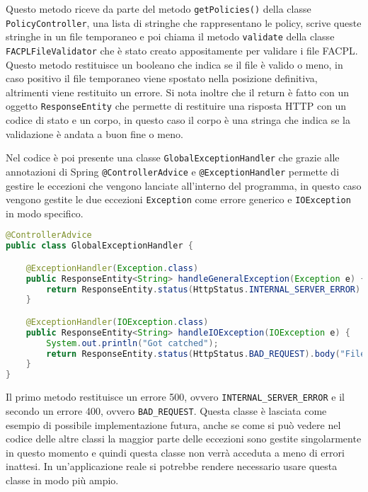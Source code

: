 Questo metodo riceve da parte del metodo \texttt{getPolicies()} della classe \texttt{PolicyController}, una lista di stringhe che rappresentano le policy, scrive queste stringhe in un file temporaneo e poi chiama il metodo \texttt{validate} della classe \texttt{FACPLFileValidator} che è stato creato appositamente per validare i file FACPL. Questo metodo restituisce un booleano che indica se il file è valido o meno, in caso positivo il file temporaneo viene spostato nella posizione definitiva, altrimenti viene restituito un errore. Si nota inoltre che il return è fatto con un oggetto \texttt{ResponseEntity} che permette di restituire una risposta HTTP con un codice di stato e un corpo, in questo caso il corpo è una stringa che indica se la validazione è andata a buon fine o meno.\par
Nel codice è poi presente una classe \texttt{GlobalExceptionHandler} che grazie alle annotazioni di Spring \texttt{@ControllerAdvice} e \texttt{@ExceptionHandler} permette di gestire le eccezioni che vengono lanciate all'interno del programma, in questo caso vengono gestite le due eccezioni \texttt{Exception} come errore generico e \texttt{IOException} in modo specifico.
\begin{lstlisting}[language=Java, caption=GlobalExceptionHandler, label=code:GlobalExceptionHandler, basicstyle=\fontsize{9.5}{11}\ttfamily]
@ControllerAdvice
public class GlobalExceptionHandler {

    @ExceptionHandler(Exception.class)
    public ResponseEntity<String> handleGeneralException(Exception e) {
        return ResponseEntity.status(HttpStatus.INTERNAL_SERVER_ERROR).body("An unexpected error occurred: " + e.getMessage());
    }

    @ExceptionHandler(IOException.class)
    public ResponseEntity<String> handleIOException(IOException e) {
    	System.out.println("Got catched");
        return ResponseEntity.status(HttpStatus.BAD_REQUEST).body("File processing error: " + e.getMessage());
    }
}
\end{lstlisting}
Il primo metodo restituisce un errore 500, ovvero \texttt{INTERNAL\_SERVER\_ERROR} e il secondo un errore 400, ovvero \texttt{BAD\_REQUEST}. Questa classe è lasciata come esempio di possibile implementazione futura, anche se come si può vedere nel codice delle altre classi la maggior parte delle eccezioni sono gestite singolarmente in questo momento e quindi questa classe non verrà acceduta a meno di errori inattesi. In un'applicazione reale si potrebbe rendere necessario usare questa classe in modo più ampio.

